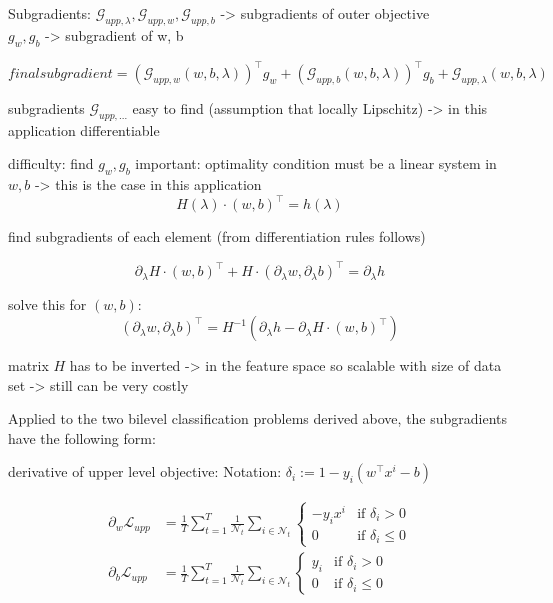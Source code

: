 Subgradients:
\(\mathcal{G}_{upp,\lambda}, \mathcal{G}_{upp,w},\mathcal{G}_{upp,b}\) -> subgradients of outer objective \\
\(g_w, g_b\) -> subgradient of w, b

\[ final subgradient = \left(\mathcal{G}_{upp,w}(w,b,\lambda)\right)^{\top}g_w+\left(\mathcal{G}_{upp,b}(w,b,\lambda)\right)^{\top}g_b+\mathcal{G}_{upp,\lambda}(w,b,\lambda) 
\label{subgr_upp}\]

subgradients \(\mathcal{G}_{upp,...}\) easy to find (assumption that locally Lipschitz) -> in this application differentiable

difficulty: find \(g_w, g_b\)
important: optimality condition must be a linear system in \(w,b\) -> this is the case in this application
\[ H(\lambda)\cdot (w,b)^{\top} = h(\lambda) \]

find subgradients of each element (from differentiation rules follows)

\[ \partial_{\lambda} H\cdot (w,b)^{\top} + H \cdot(\partial_{\lambda} w, \partial_{\lambda} b)^{\top} = \partial_{\lambda} h  \]

solve this for \((w,b)\):
\[ (\partial_{\lambda} w, \partial_{\lambda}b)^{\top} = H^{-1}\left(\partial_{\lambda}h-\partial_{\lambda} H \cdot(w,b)^{\top}\right) \]

matrix \(H\) has to be inverted -> in the feature space so scalable with size of data set -> still can be very costly \cite{Moore2011}

Applied to the two bilevel classification problems derived above, the subgradients have the following form:

derivative of upper level objective:
Notation: \(\delta_i := 1-y_i(w^{\top}x^i-b)\)

\begin{align}
	\partial_{w}\mathcal{L}_{upp}&= \frac{1}{T}\sum_{t=1}^T\frac{1}{\mathcal{N}_t}\sum_{i \in \mathcal{N}_t}{\left\{\begin{array}{cl} -y_ix^i & \text{if } \delta_i >0 \\ 0 & \text{if } \delta_i \leq 0 \end{array} \right.} \\
	\partial_{b}\mathcal{L}_{upp}&= \frac{1}{T}\sum_{t=1}^T\frac{1}{\mathcal{N}_t}\sum_{i \in \mathcal{N}_t}{\left\{\begin{array}{cl} y_i & \text{if } \delta_i >0 \\ 0 & \text{if } \delta_i \leq 0 \end{array} \right.}
	\end{align}
	

